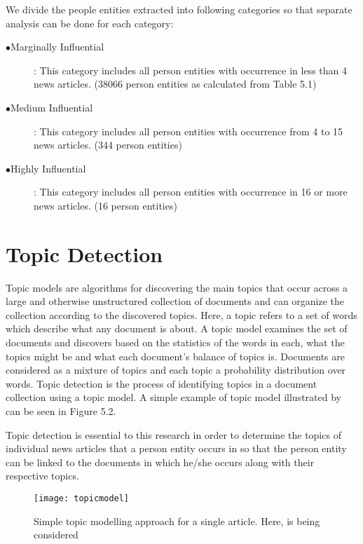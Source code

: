 We divide the people entities extracted into following categories so that separate analysis can be done for each category:
\begin{description}
 \item[$\bullet$Marginally Influential]: This category includes all person entities with occurrence in less than 4 news articles. (38066 person entities as calculated from Table 5.1)
\item[$\bullet$Medium Influential]: This category includes all person entities with occurrence from 4 to 15 news articles. (344 person entities) 
\item[$\bullet$Highly Influential] : This category includes all person entities with occurrence in 16 or more news articles. (16 person entities)
\end{description}



\section{Topic Detection}
\label{topic detection}

 Topic models are algorithms for discovering the main topics that occur across a large and otherwise 
unstructured collection of documents and can organize the collection according to the discovered topics.
Here, a topic refers to a set of words which describe what any document is about.
 A topic model examines the set of documents and discovers based on the statistics of the words in each, what the topics might be and what each document's balance of topics is.
Documents are considered as a mixture of topics and each topic a probability distribution over words.
 Topic detection is the process of identifying topics in a document collection using a topic model. A simple example of topic model illustrated by \cite{blei2012probabilistic} can be seen in Figure 5.2.

Topic detection is essential to this research in order to determine the topics of individual news articles that a person entity occurs in so that the person entity can be linked to the documents in which he/she occurs along with their respective topics.

\begin{figure}[h]
\begin{center}
\texttt{[image: topicmodel]}
\caption{Simple topic modelling approach for a single article\cite{blei2012probabilistic}. Here, is being considered }
\end{center}
\end{figure} 


